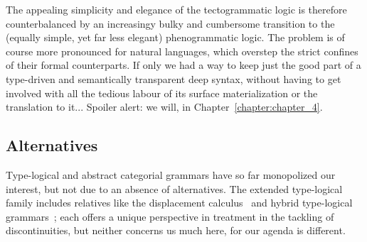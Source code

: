 
The appealing simplicity and elegance of the tectogrammatic logic is therefore counterbalanced by an increasingy bulky and cumbersome transition to the (equally simple, yet far less elegant) phenogrammatic logic.
The problem is of course more pronounced for natural languages, which overstep the strict confines of their formal counterparts.
If only we had a way to keep just the good part of a type-driven and semantically transparent deep syntax, without having to get involved with all the tedious labour of its surface materialization or the translation to it...
Spoiler alert: we will, in Chapter~\ref{chapter:chapter_4}.

\subsection{Alternatives}
Type-logical and abstract categorial grammars have so far monopolized our interest, but not due to an absence of alternatives.
The extended type-logical family includes relatives like the displacement calculus~\cite{morrill2011displacement} and hybrid type-logical grammars~\cite{kubota2012gapping}; each offers a unique perspective in treatment in the tackling of discontinuities, but neither concerns us much here, for our agenda is different.

